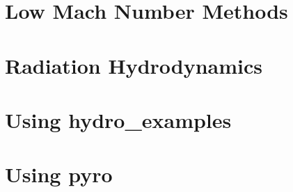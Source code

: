 \documentclass[11pt]{book}
\newcommand{\pyro}{{\sf pyro}}
\newcommand{\hydroex}{{\sf hydro\_examples}}
\begin{document}


\chapter{Low Mach Number Methods}



\chapter{Radiation Hydrodynamics}




\appendix

\chapter{Using \hydroex}



\chapter{Using \pyro}





\backmatter



\end{document}
